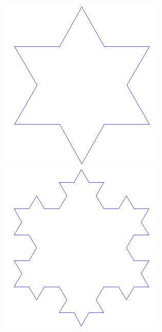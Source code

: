 \documentclass{beamer}
\begin{document}
\begin{frame}
\begin{columns}
\begin{overprint}
        \includegraphics[width=\textwidth]{images/koch-1}
        \includegraphics[width=\textwidth]{images/koch-2}

\end{overprint}
\end{columns}
\end{frame}
\end{document}
